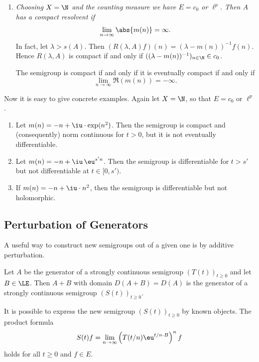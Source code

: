 \begin{example}
\begin{enumerate}[\upshape (i), wide, labelindent=.25em]
%
\[
	S(\theta + \pi/2) \subset \rho(A) .
\]
%
\begin{proof}
The condition is necessary by Theorem~\ref{thm:a2-1.12}.
Conversely, if\/ $S(\theta + \pi/2) \subset~\rho(A)$, then one verifies directly that 
\[
(T(z)f)(x) = \eu^{z \cdot m(x)}f(x) \quad (f \in E, x \in X) 
\]
defines a family $(T(z))_{z \in S(\theta)}$ of bounded operators satisfying conditions (i) and (ii)
of Definition~\ref{def:a2-1.11}.
\end{proof}
\item \label{ex:a2-1.28-4}
\textit{Choosing $X = \N$ and the counting measure we have $E = c_{0}$ or $\ell^{p}$.
Then $A$ has a compact resolvent if }
%
\[
	\lim_{n \to \infty} \abs{m(n)} = \infty .
\]
%
In fact, let $\lambda > s(A)$.
Then $(R(\lambda,A)f)(n) = (\lambda-m(n))^{-1}f(n)$.
Hence $R(\lambda,A)$ is compact if and only if\/ $((\lambda-m(n))^{-1})_{n \in \N} \in c_{0}$. 

The semigroup is compact if and only if it is eventually compact if and only if 
\[
\lim_{n \to \infty} \Re(m(n)) = -\infty.
\]
\end{enumerate}
Now it is easy to give concrete examples. 
Again let $X = \N$, so that $E = c_{0}$ or $\ell^{p}$.
\begin{enumerate}[\upshape(i)]%

\item
Let $m(n) = -n + \iu \cdot \exp(n^{2})$.
Then the semigroup is compact and (consequently) norm continuous for $t > 0$, but it is not eventually differentiable.

\item
Let $m(n) = -n + \iu \,\eu^{s'n}$.
Then the semigroup is differentiable for $t > s'$ but not differentiable at $t \in [0,s')$.

\item
If\/ $m(n) = -n +\iu \cdot n^2$, then the semigroup is differentiable but not holomorphic.

\end{enumerate}
\end{example}	

\subsection{Perturbation of Generators} \label{subsec:a2-1.se8}
A useful way to construct new semigroups out of a given one is by additive perturbation.%
\begin{theorem}\label{thm:a2-1.29}
Let $A$ be the generator of a strongly continuous semigroup $(T(t))_{t \geq 0}$ and let $B \in \LE$.
Then $A + B$ with domain $D(A+B) = D(A)$ is the generator of a strongly continuous semigroup $(S(t))_{t \geq 0}$.
\end{theorem}
It is possible to express the new semigroup $(S(t))_{t \geq 0}$ by known objects.
The product formula
\begin{equation}\label{eq:a2-1.8}
    S(t)f = \lim_{n \to \infty} \left( T(t/n)\eu^{t/n \cdot B} \right)^{n} f
\end{equation}
holds for all $t \geq 0$ and $f \in E$.

